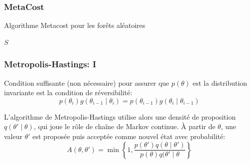 \documentclass[dvipsnames,10pt]{beamer}
\DeclareMathOperator*{\argmin}{arg\,min}
\theoremstyle{plain}
\theoremstyle{definition}
\begin{document}
\begin{frame}[fragile]
\frametitle{MetaCost}
\begin{algorithm}[H]
\caption{Algorithme Metacost pour les forêts aléatoires}\label{alg:metacost}
\begin{algorithmic}
    
    
            \Else {}
            \EndIf
        \EndFor
        \State{$y \gets \argmin_i \sum_j \hat{p}(j \mid x) C(i,j)$}
    \EndFor
    \State \Return $S$
    \EndProcedure
\end{algorithmic}    
\end{algorithm}
\end{frame}

\begin{frame}
\frametitle{Metropolis-Hastings: I}
Condition suffisante (non nécessaire) pour assurer que $p(\theta)$ est la distribution invariante est la condition de réversibilité:
\begin{equation}\label{equ:detailed.balance}
    p( \theta_i ) g ( \theta_{i-1} \mid \theta_i ) = p( \theta_{i-1} ) g ( \theta_{i} \mid \theta_{i-1} )
\end{equation}

L'algorithme de Metropolis-Hastings utilise alors une densité de proposition $q (\theta' \mid \theta)$, qui joue le rôle de chaîne de Markov continue. À partir de $\theta$, une valeur $\theta'$ est proposée puis acceptée comme nouvel état avec probabilité:
\begin{equation*}
    A(\theta,\theta') = \min \left\{ 1 , \frac{p(\theta') q(\theta \mid \theta')}{p(\theta) q(\theta'\mid \theta} \right\}
\end{equation*}
\end{frame}
\end{document}
